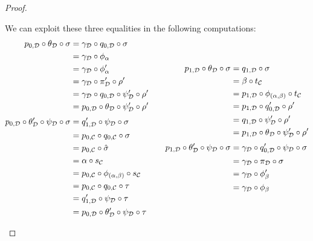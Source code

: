 \documentclass[a4paper,UKenglish,cleveref,pdftex,thm-restate,numberwithinsect]{lipics-v2021}
\begin{document}
\begin{proof}
\begin{enumerate}
\begin{itemize}
			We can exploit these three equalities in the following computations:
 			\[\begin{split} p_{0, \mathcal{D}}\circ \theta_{\mathcal{D}}\circ \sigma &=\gamma_{\mathcal{D}}\circ q_{0, \mathcal{D}}\circ \sigma\\&=  \gamma_{\mathcal{D}}\circ \phi_\alpha
 				\\&= \gamma_{\mathcal{D}}\circ \phi'_\alpha 
 				\\&= \gamma_{\mathcal{D}}\circ \pi'_{\mathcal{D}}\circ \rho'
 				\\&=\gamma_{\mathcal{D}}\circ q_{0, \mathcal{D}}\circ\psi'_{\mathcal{D}} \circ \rho' 
 				\\&= p_{0, \mathcal{D}}\circ \theta_{\mathcal{D}}\circ \psi'_{\mathcal{D}}\circ \rho'\\[.2\baselineskip]
 				p_{0, \mathcal{D}}\circ \theta'_{\mathcal{D}}\circ \psi_{\mathcal{D}} \circ \sigma &=q'_{1, \mathcal{D}}\circ \psi_{\mathcal{D}}\circ \sigma\\&= p_{0, \mathcal{C}}\circ q_{0, \mathcal{C}}\circ \sigma \\&= p_{0, \mathcal{C}}\circ \hat{\sigma}\\&=  \alpha \circ s_{\mathcal{C}}
 				\\&= p_{0, \mathcal{C}}\circ \phi_{(\alpha, \beta)}\circ s_{\mathcal{C}}
 				\\&= p_{0, \mathcal{C}}\circ q_{0, \mathcal{C}}\circ \tau
 				\\&=q'_{1, \mathcal{D}}\circ \psi_{\mathcal{D}}\circ\tau 
 				\\&= p_{0, \mathcal{D}}\circ \theta'_{\mathcal{D}}\circ \psi_{\mathcal{D}}\circ \tau 
 			\end{split} \qquad \begin{split}
 		p_{1, \mathcal{D}}\circ \theta_{\mathcal{D}} \circ \sigma &=q_{1, \mathcal{D}}\circ  \sigma\\&=\beta\circ t_{\mathcal{C}}\\&=  p_{1, \mathcal{D}}\circ \phi_{(\alpha, \beta)}\circ t_{\mathcal{C}}
 			\\&= p_{1, \mathcal{D}}\circ q'_{0, \mathcal{D}}\circ \rho'
 			\\&=  q_{1, \mathcal{D}}\circ \psi'_{\mathcal{D}}\circ \rho'
 			\\&= p_{1, \mathcal{D}}\circ \theta_{\mathcal{D}}\circ \psi'_{\mathcal{D}}\circ \rho' \\[.2\baselineskip]  	p_{1, \mathcal{D}}\circ \theta'_{\mathcal{D}}\circ \psi_{\mathcal{D}} \circ \sigma &=\gamma_{\mathcal{D}}\circ q'_{0, \mathcal{D}}\circ \psi_{\mathcal{D}}\circ \sigma\\&=\gamma_{\mathcal{D}}\circ \pi_{\mathcal{D}}\circ \sigma\\&= \gamma_{\mathcal{D}}\circ \phi'_{\beta}\\&=  \gamma_{\mathcal{D}}\circ \phi_{\beta}

\end{split}\]
\end{itemize}
\end{enumerate}
\end{proof}
\end{document}

